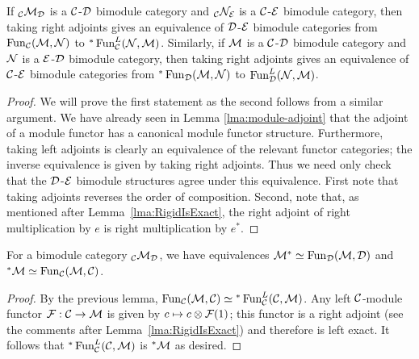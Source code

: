 \documentclass{amsart}
\begin{document}
\begin{lemma}
If ${}_{\mathcal C}\mathcal M_\mathcal D$ is a $\mathcal C$-$\mathcal D$ bimodule category and ${}_{\mathcal C}\mathcal N_\mathcal E$ is a $\mathcal C$-$\mathcal E$ bimodule category, then taking right adjoints gives an equivalence of $\mathcal D$-$\mathcal E$ bimodule categories 
from $\operatorname{Fun}_{\mathcal C}(\mathcal M, \mathcal N)$ to ${}^*\operatorname{Fun}^L_{\mathcal C}(\mathcal N, \mathcal M)$.
Similarly, if $\mathcal M$ is a $\mathcal C$-$\mathcal D$ bimodule category and $\mathcal N$ is a $\mathcal E$-$\mathcal D$ bimodule category, then taking right adjoints gives an equivalence of $\mathcal C$-$\mathcal E$ bimodule categories from ${}^*\operatorname{Fun}_{\mathcal D}(\mathcal M, \mathcal N)$ to $\operatorname{Fun}^L_{\mathcal D}(\mathcal N, \mathcal M)$. 
\end{lemma}
\begin{proof}
	We will prove the first statement as the second follows from a similar argument. 
We have already seen in Lemma \ref{lma:module-adjoint} that the adjoint of a module functor has a canonical module functor structure.  Furthermore, taking left adjoints is clearly an equivalence of the relevant functor categories; the inverse equivalence is given by taking right adjoints. Thus we need only check that the $\mathcal D$-$\mathcal E$ bimodule structures agree under this equivalence.  First note that taking adjoints reverses the order of composition. Second, note that, as mentioned after Lemma~\ref{lma:RigidIsExact}, the right adjoint of right multiplication by $e$ is right multiplication by $e^*$.
\end{proof}

\begin{lemma} \label{lem:dual-formula-for-adjoints}
For a bimodule category ${}_\mathcal C \mathcal M_\mathcal D$, we have equivalences $\mathcal M^* \simeq \operatorname{Fun}_{\mathcal D}(\mathcal M, \mathcal D)$ and ${}^*\mathcal M \simeq \operatorname{Fun}_{\mathcal C}(\mathcal M, \mathcal C)$.
\end{lemma}
\begin{proof}
By the previous lemma, $\operatorname{Fun}_{\mathcal C}(\mathcal M, \mathcal C) \simeq {}^*\operatorname{Fun}_{\mathcal C}^L(\mathcal C, \mathcal M)$.  Any left $\mathcal C$-module functor $\mathcal F: \mathcal C \rightarrow \mathcal M$ is given by $c \mapsto c \otimes \mathcal F(1)$; this functor is a right adjoint (see the comments after Lemma~\ref{lma:RigidIsExact}) and therefore is left exact.  It follows that ${}^*\operatorname{Fun}_{\mathcal C}^L(\mathcal C, \mathcal M)$ is ${}^* \mathcal M$ as desired.
\end{proof}
\end{document}
